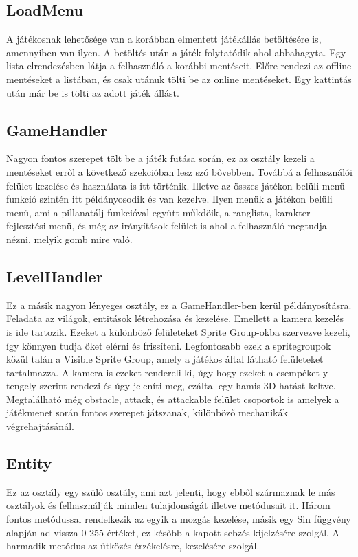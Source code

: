\subsection{LoadMenu}
A játékosnak lehetősége van a korábban elmentett játékállás betöltésére is, amennyiben van ilyen. A betöltés után a játék folytatódik ahol abbahagyta. Egy lista elrendezésben látja a felhasználó a korábbi mentéseit. Előre rendezi az offline mentéseket a listában, és csak utánuk tölti be az online mentéseket. Egy kattintás után már be is tölti az adott játék állást.


\subsection{GameHandler}
Nagyon fontos szerepet tölt be a játék futása során, ez az osztály kezeli a mentéseket erről a következő szekcióban lesz szó bővebben. 
Továbbá a felhasználói felület kezelése és használata is itt történik. Illetve az összes játékon belüli menü funkció szintén itt példányosodik és van kezelve. Ilyen menük a játékon belüli menü, ami a pillanatálj funkcióval együtt műkdöik, a ranglista, karakter fejlesztési menü, és még az irányítások felület is ahol a felhasználó megtudja nézni, melyik gomb mire való.

\subsection{LevelHandler}
Ez a másik nagyon lényeges osztály, ez a GameHandler-ben kerül példányosításra. Feladata az világok, entitások létrehozása és kezelése. Emellett a kamera kezelés is ide tartozik. 
Ezeket a különböző felületeket Sprite Group-okba szervezve kezeli, így könnyen tudja őket elérni és frissíteni.
Legfontosabb ezek a spritegroupok közül talán a Visible Sprite Group, amely a játékos által látható felületeket tartalmazza. A kamera is ezeket rendereli ki, úgy hogy ezeket a csempéket y tengely szerint rendezi és úgy jeleníti meg, ezáltal egy hamis 3D hatást keltve.
Megtalálható még obstacle, attack, és attackable felület csoportok is amelyek a játékmenet során fontos szerepet játszanak, különböző mechanikák végrehajtásánál.


\subsection{Entity}
Ez az osztály egy szülő osztály, ami azt jelenti, hogy ebből származnak le más osztályok és felhasználják minden tulajdonságát illetve metódusait it.  
Három fontos metódussal rendelkezik az egyik a mozgás kezelése, másik egy Sin függvény alapján ad vissza 0-255 értéket, ez később a kapott sebzés kijelzésére szolgál. A harmadik metódus az ütközés érzékelésre, kezelésére szolgál.

